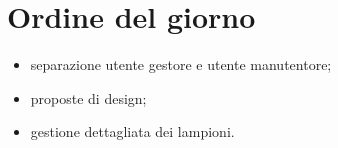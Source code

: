 \section{Ordine del giorno}

\begin{itemize}
    \item separazione utente gestore e utente manutentore;
    \item proposte di design;
    \item gestione dettagliata dei lampioni.
\end{itemize}
